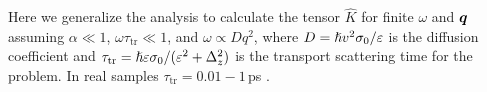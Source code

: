 Here we generalize the analysis to calculate the tensor $\hat{K}$ for finite $\omega$ and $\boldsymbol{q}$ assuming $\alpha\ll 1$, $\omega\tau_\textrm{tr}\ll 1$, and $\omega \propto Dq^2$, where $D=\hslash v^2  \sigma_0/\varepsilon$ is the diffusion coefficient and $\tau_\textrm{tr}=\hslash\varepsilon\sigma_0/(\varepsilon^2+\Delta_z^2)$ is the transport scattering time for the problem. In real samples $\tau_\textrm{tr}=0.01 - 1$\,ps \cite{kong_rapid_2011,kamboj_probing_2017,huang_enhancement_2017,xiang_transport_2014}.



